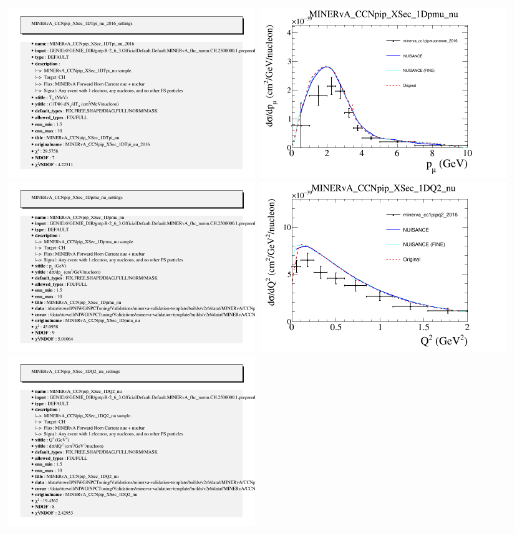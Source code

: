 \documentclass{article}
\begin{document}
\includegraphics[width=0.49\textwidth]{figures/minerva_cc1pipke_2016_info.png}
\centering
\includegraphics[width=0.49\textwidth]{figures/minerva_cc1pipmuonmom_2016_comp.png}
\includegraphics[width=0.49\textwidth]{figures/minerva_cc1pipmuonmom_2016_info.png}
\centering
\includegraphics[width=0.49\textwidth]{figures/minerva_cc1pipq2_2016_comp.png}
\includegraphics[width=0.49\textwidth]{figures/minerva_cc1pipq2_2016_info.png}
\end{document}
